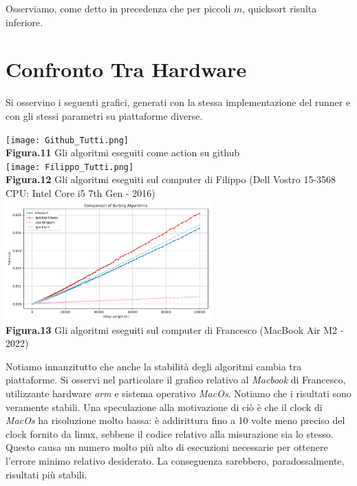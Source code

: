 \documentclass{article}
\begin{document}
            Osserviamo, come detto in precedenza che per piccoli $m$, quicksort risulta inferiore.

\section{Confronto Tra Hardware}
    Si osservino i seguenti grafici, generati con la stessa implementazione del runner e con gli stessi parametri su piattaforme diverse.

    \begin{center}
        \texttt{[image: Github\_Tutti.png]} \\
        \textbf{Figura.11} Gli algoritmi eseguiti come action su github\\
        \vspace{0.2cm}
        \texttt{[image: Filippo\_Tutti.png]} \\
        \textbf{Figura.12} Gli algoritmi eseguiti sul computer di Filippo (Dell Vostro 15-3568 CPU: Intel Core i5 7th Gen - 2016)\\
        \vspace{0.5cm}
        \includegraphics[width=0.6\textwidth]{Tutti.png} \\
        \textbf{Figura.13} Gli algoritmi eseguiti sul computer di Francesco (MacBook Air M2 - 2022)\\
    \end{center}

    Notiamo innanzitutto che anche la stabilità degli algoritmi cambia tra piattaforme. Si osservi nel particolare il grafico relativo al \textit{Macbook} di Francesco, utilizzante hardware \textit{arm} e sistema operativo \textit{MacOs}. Notiamo che i risultati sono veramente stabili.
    Una speculazione alla motivazione di ciò è che il clock di \textit{MacOs} ha risoluzione molto bassa: è addirittura fino a 10 volte meno preciso del clock fornito da linux, sebbene il codice relativo alla misurazione sia lo stesso. Questo causa un numero molto più alto di esecuzioni necessarie per ottenere l'errore minimo relativo desiderato. La conseguenza sarebbero, paradossalmente, risultati più stabili.
\end{document}

